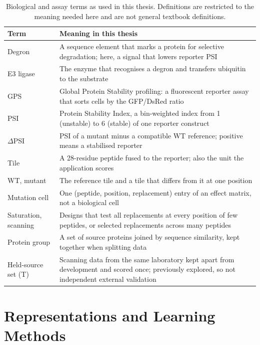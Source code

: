 \begin{table}[htbp]
  \centering
  \caption[Biological and assay terms as used in this thesis]{Biological and assay terms as used in this thesis. Definitions are restricted to the
  meaning needed here and are not general textbook definitions.}
  \label{tab:bio-terms}
  {\small\setlength{\tabcolsep}{4pt}
  \begin{tabularx}{\textwidth}{@{}>{\raggedright\arraybackslash}p{3.0cm}X@{}}
    \toprule
    Term & Meaning in this thesis \\
    \midrule
    Degron & A sequence element that marks a protein for selective degradation; here, a signal that lowers reporter PSI \\
    E3 ligase & The enzyme that recognises a degron and transfers ubiquitin to the substrate \\
    GPS & Global Protein Stability profiling: a fluorescent reporter assay that sorts cells by the GFP/DsRed ratio \\
    PSI & Protein Stability Index, a bin-weighted index from 1 (unstable) to 6 (stable) of one reporter construct \\
    $\Delta$PSI & PSI of a mutant minus a compatible WT reference; positive means a stabilised reporter \\
    Tile & A 28-residue peptide fused to the reporter; also the unit the application scores \\
    WT, mutant & The reference tile and a tile that differs from it at one position \\
    Mutation cell & One (peptide, position, replacement) entry of an effect matrix, not a biological cell \\
    Saturation, scanning & Designs that test all replacements at every position of few peptides, or selected replacements across many peptides \\
    Protein group & A set of source proteins joined by sequence similarity, kept together when splitting data \\
    Held-source set (T) & Scanning data from the same laboratory kept apart from development and scored once; previously explored, so not independent external validation \\
    \bottomrule
  \end{tabularx}}
\end{table}

\section{Representations and Learning Methods}
